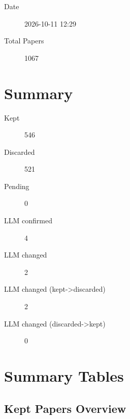 \documentclass{article}
\begin{document}
\begin{description}
\item[Date] 2026-10-11 12:29
\item[Total Papers] 1067
\end{description}

\section{Summary}
\begin{description}
\item[Kept] 546
\item[Discarded] 521
\item[Pending] 0
\item[LLM confirmed] 4
\item[LLM changed] 2
\item[LLM changed (kept->discarded)] 2
\item[LLM changed (discarded->kept)] 0
\end{description}

\section{Summary Tables}

\subsection{Kept Papers Overview}
\end{document}
